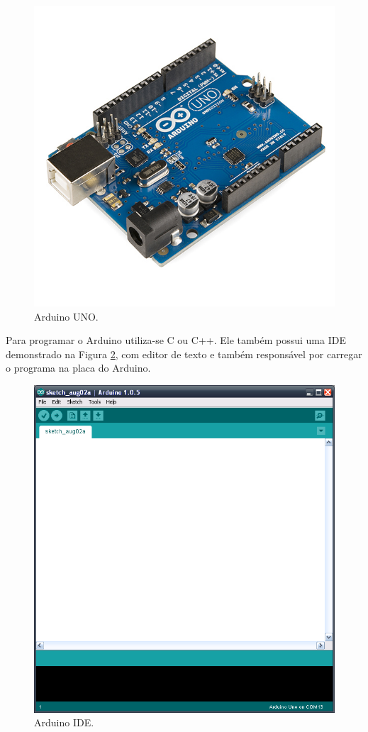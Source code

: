 \begin{figure}[htbp]
	\centering
		\includegraphics[scale=0.2]{referencial/figuras/arduinoUno.jpg}
	\caption{Arduino UNO.}
	\label{fig:arduinoUno}
\end{figure}

Para programar o Arduino utiliza-se C ou C++. Ele também possui uma IDE demonstrado na Figura \ref{fig:arduinoIde}, com editor de texto e também responsável por carregar o programa na placa do Arduino.

\begin{figure}[htbp]
	\centering
		\includegraphics[scale=0.2]{referencial/figuras/arduinoIde.png}
	\caption{Arduino IDE.}
	\label{fig:arduinoIde}
\end{figure}


